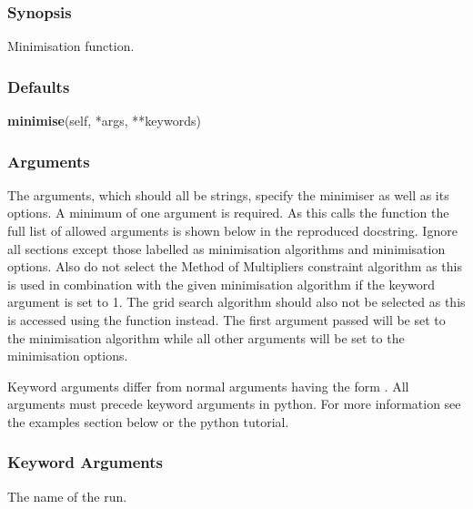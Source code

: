 \subsubsection{Synopsis}

Minimisation function.



\subsubsection{Defaults}

\textsf{\textbf{minimise}(self, *args, **keywords)}


\subsubsection{Arguments}

The arguments, which should all be strings, specify the minimiser as well as its options.  A minimum of one argument is required.  As this calls the function  the full list of allowed arguments is shown below in the reproduced  docstring. Ignore all sections except those labelled as minimisation algorithms and minimisation options.  Also do not select the Method of Multipliers constraint algorithm as this is used in combination with the given minimisation algorithm if the keyword argument  is set to 1.  The grid search algorithm should also not be selected as this is accessed using the  function instead.  The first argument passed will be set to the minimisation algorithm while all other arguments will be set to the minimisation options.


Keyword arguments differ from normal arguments having the form .  All arguments must precede keyword arguments in python.  For more information see the examples section below or the python tutorial.



\subsubsection{Keyword Arguments}

  The name of the run. 

